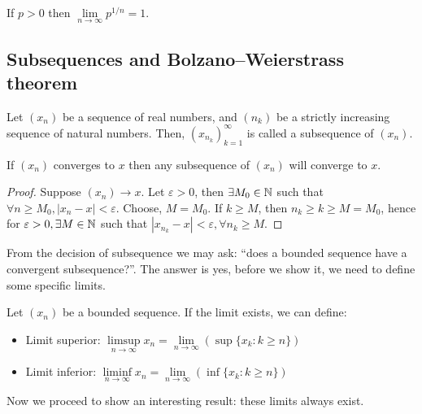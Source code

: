 \begin{theorem}
    If $p>0$ then $\lim \limits_{n \to \infty} p^{1/n}=1$.
\end{theorem}

\subsection{Subsequences and Bolzano–Weierstrass theorem}

\begin{definition}[Subsequence]
    Let $(x_n)$ be a sequence of real numbers, and $(n_k)$ be a strictly increasing sequence of natural numbers. Then, $(x_{n_k})_{k=1}^\infty$ is called a subsequence of $(x_n)$.
\end{definition}

\begin{theorem}
    If $(x_n)$ converges to $x$ then any subsequence of $(x_n)$ will converge to $x$.
\end{theorem}

\begin{proof}
    Suppose $(x_n) \to x$. Let $\varepsilon > 0$, then $\exists M_0 \in \mathbb{N}$ such that $\forall n \geq M_0, |x_n-x| < \varepsilon$. Choose, $M=M_0$. If $k \geq M$, then $n_k \geq k \geq M = M_0$, hence for $\varepsilon>0, \exists M \in \mathbb{N}$ such that $|x_{n_k}-x| < \varepsilon, \forall n_k \geq M$.
\end{proof}

From the decision of subsequence we may ask: ``does a bounded sequence have a convergent subsequence?''. The answer is yes, before we show it, we need to define some specific limits.

\begin{definition}
    Let $(x_n)$ be a bounded sequence. If the limit exists, we can define:
    \begin{itemize}
        \item Limit superior: $\limsup \limits_{n \to \infty} x_n = \lim \limits_{n \to \infty} \left( \sup \{ x_k: k \geq n\}\right)$
        \item Limit inferior: $\liminf \limits_{n \to \infty} x_n = \lim \limits_{n \to \infty} \left( \inf \{ x_k: k \geq n\}\right)$
    \end{itemize}
\end{definition}

Now we proceed to show an interesting result: these limits always exist.

